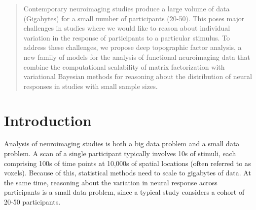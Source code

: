 \documentclass{article}
\begin{document}






\begin{abstract}
Contemporary neuroimaging studies produce a large volume of data (Gigabytes) for a small number of participants (20-50). This poses major challenges in studies where we would like to reason about individual variation in the response of participants to a particular stimulus.
To address these challenges, we propose deep topographic factor analysis, a new family of models for the analysis of functional neuroimaging data that combine the computational scalability of matrix factorization with variational Bayesian methods for reasoning about the distribution of neural responses in studies with small sample sizes. 
\end{abstract}

\section{Introduction}

Analysis of neuroimaging studies is both a big data problem and a small data problem. A scan of a single participant typically involves 10s of stimuli, each comprising 100s of time points at 10,000s of spatial locations (often referred to as voxels). Because of this, statistical methods need to scale to gigabytes of data. At the same time, reasoning about the variation in neural response across participants is a small data problem, since a typical study considers a cohort of 20-50 participants. 
\end{document}
